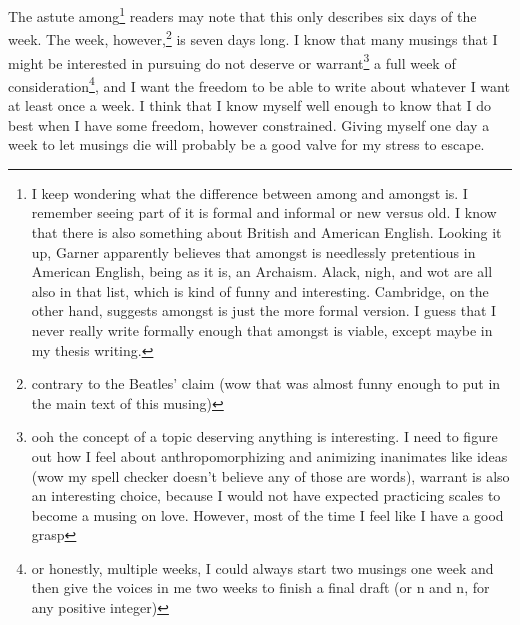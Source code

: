 \documentclass[12pt]{article}[titlepage]
\renewcommand{\,}{\textsuperscript{,}}
\begin{document}
The astute among\footnote{I keep wondering what the difference between among and amongst is. I remember seeing part of it is formal and informal or new versus old. I know that there is also something about British and American English. Looking it up, Garner apparently believes that amongst is needlessly pretentious in American English, being as it is, an Archaism. Alack, nigh, and wot are all also in that list, which is kind of funny and interesting. Cambridge, on the other hand, suggests amongst is just the more formal version. I guess that I never really write formally enough that amongst is viable, except maybe in my thesis writing.} readers may note that this only describes six days of the week.
The week, however,\footnote{contrary to the Beatles' claim (wow that was almost funny enough to put in the main text of this musing)} is seven days long.
I know that many musings that I might be interested in pursuing do not deserve or warrant\footnote{ooh the concept of a topic deserving anything is interesting. I need to figure out how I feel about anthropomorphizing and animizing inanimates like ideas (wow my spell checker doesn't believe any of those are words), warrant is also an interesting choice, because I would not have expected practicing scales to become a musing on love. However, most of the time I feel like I have a good grasp} a full week of consideration\footnote{or honestly, multiple weeks, I could always start two musings one week and then give the voices in me two weeks to finish a final draft (or n and n, for any positive integer)}, and I want the freedom to be able to write about whatever I want at least once a week.
I think that I know myself well enough to know that I do best when I have some freedom, however constrained.
Giving myself one day a week to let musings die will probably be a good valve for my stress to escape.
\end{document}
